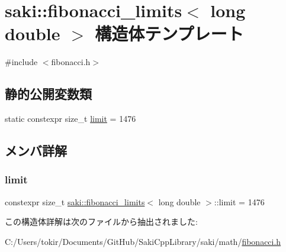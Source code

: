 \hypertarget{structsaki_1_1fibonacci__limits_3_01long_01double_01_4}{}\section{saki\+:\+:fibonacci\+\_\+limits$<$ long double $>$ 構造体テンプレート}
\label{structsaki_1_1fibonacci__limits_3_01long_01double_01_4}


{\ttfamily \#include $<$fibonacci.\+h$>$}

\subsection*{静的公開変数類}
\begin{DoxyCompactItemize}
\item 
static constexpr size\+\_\+t \mbox{\hyperlink{structsaki_1_1fibonacci__limits_3_01long_01double_01_4_a9f22226b458ffc3a1476cb53f41e199b}{limit}} = 1476
\end{DoxyCompactItemize}


\subsection{メンバ詳解}
\mbox{\label{structsaki_1_1fibonacci__limits_3_01long_01double_01_4_a9f22226b458ffc3a1476cb53f41e199b}} 
\subsubsection{\texorpdfstring{limit}{limit}}
{\footnotesize\ttfamily constexpr size\+\_\+t \mbox{\hyperlink{structsaki_1_1fibonacci__limits}{saki\+::fibonacci\+\_\+limits}}$<$ long double $>$\+::limit = 1476\hspace{0.3cm}{\ttfamily [static]}}



この構造体詳解は次のファイルから抽出されました\+:\begin{DoxyCompactItemize}
\item 
C\+:/\+Users/tokir/\+Documents/\+Git\+Hub/\+Saki\+Cpp\+Library/saki/math/\mbox{\hyperlink{fibonacci_8h}{fibonacci.\+h}}\end{DoxyCompactItemize}
